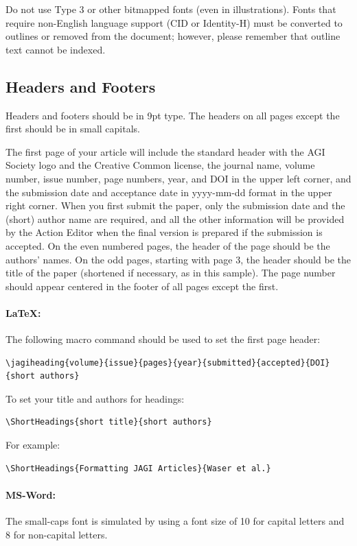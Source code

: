 \documentclass[twoside,11pt]{article}
\begin{document}
Do not use Type 3 or other bitmapped fonts (even in illustrations).  Fonts that require non-English language support (CID or Identity-H) must be converted to outlines or removed from the document; however, please remember that outline text cannot be indexed.

\subsection{Headers and Footers}
Headers and footers should be in 9pt type.  The headers on all pages except the first should be in small capitals.

The first page of your article will include the standard header with the AGI Society logo and the Creative Common license, the journal name, volume number, issue number, page numbers, year, and DOI in the upper left corner, and the submission date and acceptance date in yyyy-mm-dd format in the upper right corner.  When you first submit the paper, only the submission date and the (short) author name are required, and all the other information will be provided by the Action Editor when the final version is prepared if the submission is accepted.  On the even numbered pages, the header of the page should be the authors' names. On the odd pages, starting with page 3, the header should be the title of the paper (shortened if necessary, as in this sample).  The page number should appear centered in the footer of all pages except the first.

\paragraph{\LaTeX{}:} The following macro command should be used to set the first page header: 
\begin{verbatim}\jagiheading{volume}{issue}{pages}{year}{submitted}{accepted}{DOI}
{short authors}
\end{verbatim}

To set your title and authors for headings: 
\begin{verbatim}\ShortHeadings{short title}{short authors} 
\end{verbatim}

For example: 
\begin{verbatim}\ShortHeadings{Formatting JAGI Articles}{Waser et al.} 
\end{verbatim}

\paragraph{MS-Word:} The small-caps font is simulated by using a font size of 10 for capital letters and 8 for non-capital letters.
\end{document}
